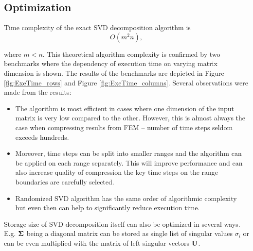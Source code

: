 \subsection{Optimization}

Time complexity of the exact SVD decomposition algorithm is $$O(m^2n),$$

where $m<n$. This theoretical algorithm complexity is confirmed by two benchmarks where the dependency of execution time on varying matrix dimension is shown. The results of the benchmarks are depicted in Figure \ref{fig:ExeTime_rows} and Figure \ref{fig:ExeTime_columns}. Several observations were made from the results:

\begin{itemize}
\item The algorithm is most efficient in cases where one dimension of the input matrix is very low compared to the other. However, this is almost always the case when compressing results from FEM -- number of time steps seldom exceeds hundreds.
\item Moreover, time steps can be split into smaller ranges and the algorithm can be applied on each range separately. This will improve performance and can also increase quality of compression the key time steps on the range boundaries are carefully selected.
\item Randomized SVD algorithm has the same order of algorithmic complexity but even then can help to significantly reduce execution time.
\end{itemize}

Storage size of SVD decomposition itself can also be optimized in several ways. E.g. $\mathbf{\Sigma}$ being a diagonal matrix can be stored as single list of singular values $\sigma_{i}$ or can be even multiplied with the matrix of left singular vectors $\mathbf{U}$.

